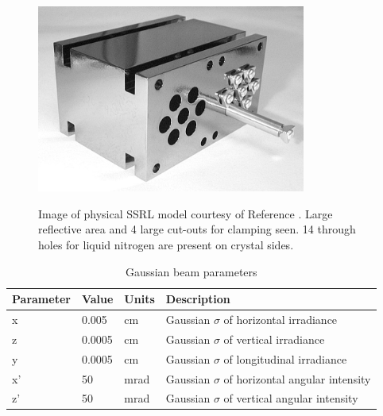 \documentclass{iucr}
\begin{document}
\begin{figure}
\caption{Image of physical SSRL model courtesy of Reference \cite{stanford}. Large reflective area and 4 large cut-outs for clamping seen. 14 through holes for liquid nitrogen are present on crystal sides.}
\includegraphics[width = 8.85cm]{images/ssrlsilicon.jpg}
\label{fig:ssrl_silicon}
\end{figure}





\begin{table}\label{gaussian_table}
\caption{Gaussian beam parameters}
\begin{tabular}{@{}llll@{}}
Parameter       & Value         & Units     & Description                                           \\
\hline
x               & 0.005         & cm        & Gaussian $\sigma$ of horizontal irradiance            \\
z               & 0.0005        & cm        & Gaussian $\sigma$ of vertical irradiance              \\ 
y               & 0.0005        & cm        & Gaussian $\sigma$ of longitudinal irradiance          \\
x'              & 50            & mrad      & Gaussian $\sigma$ of horizontal angular intensity     \\
z'              & 50            & mrad      & Gaussian $\sigma$ of vertical angular intensity       \\

\end{tabular}
\end{table}
\end{document}

